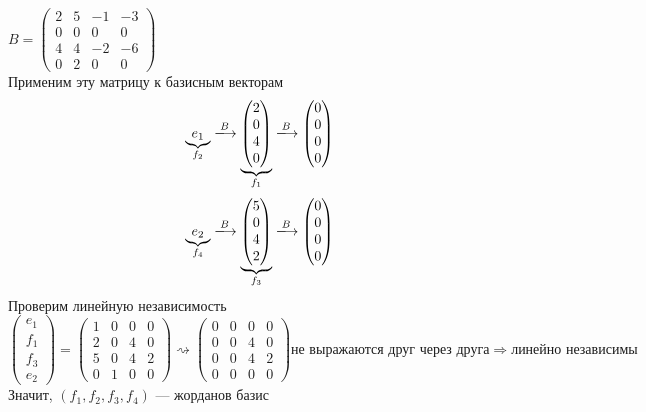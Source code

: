 \documentclass[a4paper]{article}
\begin{document}
$B=\begin{pmatrix}
    2&5&-1&-3\\
    0&0&0&0\\
    4&4&-2&-6\\
    0&2&0&0
\end{pmatrix}$\\[2mm]
Применим эту матрицу к базисным векторам
\begin{equation*}
    \underbrace{e_1}_{f_2}\xlongrightarrow{B}\underbrace{\begin{pmatrix}
        2\\
        0\\
        4\\
        0
    \end{pmatrix}}_{f_1}\xlongrightarrow{B}\begin{pmatrix}
        0\\
        0\\
        0\\
        0
    \end{pmatrix}
\end{equation*}
\begin{equation*}
    \underbrace{e_2}_{f_4}\xlongrightarrow{B}\underbrace{\begin{pmatrix}
        5\\
        0\\
        4\\
        2
    \end{pmatrix}}_{f_3}\xlongrightarrow{B}\begin{pmatrix}
        0\\
        0\\
        0\\
        0
    \end{pmatrix}
\end{equation*}
Проверим линейную независимость
\begin{equation*}
    \begin{pmatrix}
        e_1\\
        f_1\\
        f_3\\
        e_2
    \end{pmatrix}=\begin{pmatrix}
        1&0&0&0\\
        2&0&4&0\\
        5&0&4&2\\
        0&1&0&0
    \end{pmatrix}\rightsquigarrow\begin{pmatrix}
        0&0&0&0\\
        0&0&4&0\\
        0&0&4&2\\
        0&0&0&0
    \end{pmatrix}\text{не выражаются друг через друга} \Longrightarrow\text{линейно независимы}
\end{equation*}
Значит, $(f_1, f_2, f_3, f_4)$ — жорданов базис
\end{document}
